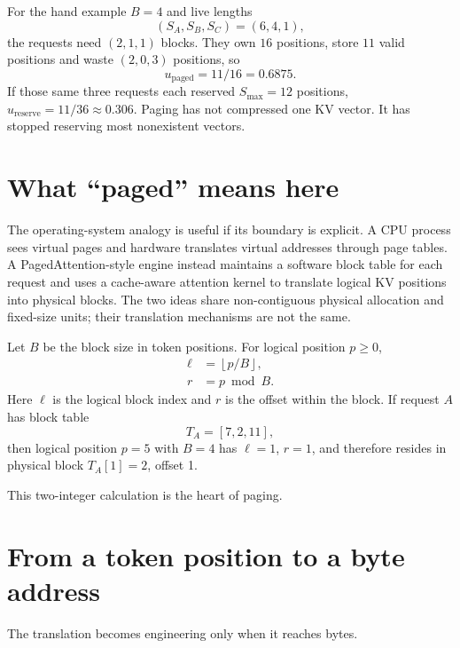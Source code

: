 For the hand example $B=4$ and live lengths
\[
  (S_A,S_B,S_C)=(6,4,1),
\]
the requests need $(2,1,1)$ blocks. They own $16$ positions, store $11$ valid
positions and waste $(2,0,3)$ positions, so
\[
u_{\mathrm{paged}}=11/16=0.6875.
\]
If those same three requests each reserved $S_{\max}=12$ positions,
$u_{\mathrm{reserve}}=11/36\approx0.306$. Paging has not compressed one KV
vector. It has stopped reserving most nonexistent vectors.

\section{What ``paged'' means here}

The operating-system analogy is useful if its boundary is explicit. A CPU
process sees virtual pages and hardware translates virtual addresses through
page tables. A PagedAttention-style engine instead maintains a software block
table for each request and uses a cache-aware attention kernel to translate
logical KV positions into physical blocks. The two ideas share
non-contiguous physical allocation and fixed-size units; their translation
mechanisms are not the same.

Let $B$ be the block size in token positions. For logical position $p\ge0$,
\begin{align}
  \ell &= \left\lfloor p/B\right\rfloor,\\
  r &= p\bmod B.
\end{align}
Here $\ell$ is the logical block index and $r$ is the offset within the block.
If request $A$ has block table
\[
  T_A=[7,2,11],
\]
then logical position $p=5$ with $B=4$ has $\ell=1$, $r=1$, and therefore
resides in physical block $T_A[1]=2$, offset 1.

This two-integer calculation is the heart of paging.


\section{From a token position to a byte address}

The translation becomes engineering only when it reaches bytes.

